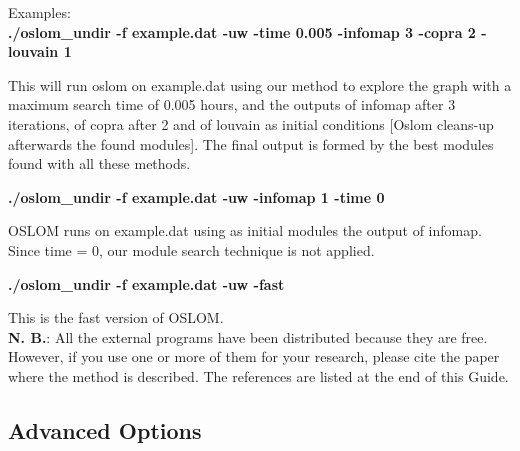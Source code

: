 \documentclass[11pt]{article}
\begin{document}
  
  Examples:
  \\
  
{ \textbf{./oslom\_undir  -f example.dat -uw -time 0.005 -infomap 3 -copra 2 -louvain 1 } }
  
This will run oslom on example.dat using our method to explore the graph with a maximum search time of 0.005 hours, and the outputs of infomap after 3 iterations, of copra after 2 and of louvain as initial conditions  [Oslom cleans-up afterwards the found modules]. The final output is formed by the best modules found with all these methods.   
  
  
{ \textbf{./oslom\_undir -f example.dat -uw -infomap 1 -time 0} }
  
OSLOM runs on example.dat using as initial modules the output of infomap. Since time = 0, our module search technique is not applied.
  
  

{ \textbf{./oslom\_undir -f example.dat -uw -fast} }


This is the fast version of OSLOM.
\\
  
  
\textbf{N. B.}: All the external programs have been distributed
because they are free. However, 
if you use one or more of them for your research, please cite the
paper where the method is described. The references 
are listed at the end of this Guide.
  
  
  \subsection{Advanced Options}
  
\end{document}
